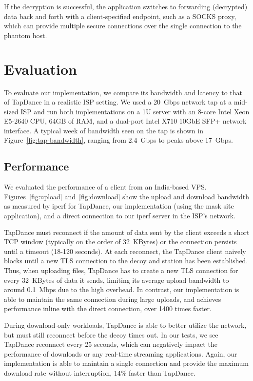 \documentclass[sigconf]{acmart}
\newcommand{\TODO}[1]{}
\renewcommand{\TODO}[1]{{\color{red} TODO: {#1}}}
\begin{document}
\FigTapBandwidth

If the decryption is successful, the application switches to forwarding
(decrypted) data back and forth with a client-specified endpoint, such as a
SOCKS proxy, which can provide multiple secure connections over the single
connection to the phantom host.


\section{Evaluation}
\label{sec:evaluation}


\FigUpload
\FigDownload

To evaluate our \scheme implementation, we compare its bandwidth and latency
to that of TapDance in a realistic ISP setting. We used a 20~Gbps
network tap at a mid-sized ISP and run both implementations on a 1U server with
an 8-core Intel Xeon E5-2640 CPU, 64GB of RAM, and a dual-port Intel X710 10GbE SFP+
network interface. A typical week of bandwidth seen on the tap is
shown in Figure~\ref{fig:tap-bandwidth}, ranging from 2.4~Gbps to peaks above
17~Gbps.

\subsection{Performance}

We evaluated the performance of a client from an India-based VPS.
Figures~\ref{fig:upload} and~\ref{fig:download} show the upload and download bandwidth as
measured by iperf for TapDance, our \scheme implementation (using the mask site application),
and a direct connection to our iperf server in the ISP's network.

TapDance must reconnect if the amount of data sent by the client
exceeds a short TCP window (typically on the order of 32~KBytes) or the
connection persists until a timeout (18-120 seconds). At each reconnect, the
TapDance client naively blocks until a new TLS connection to the decoy and
station has been established. Thus, when uploading files, TapDance has to create
a new TLS connection for every 32~KBytes of data it sends, limiting its average
upload bandwidth to around 0.1~Mbps due to the high overhead. In contrast,
our \scheme implementation is
able to maintain the same connection during large uploads, and achieves
performance inline with the direct connection, over 1400 times faster.

During download-only workloads, TapDance is able to better utilize the network,
but must still reconnect before the decoy times out. In our tests, we see
TapDance reconnect every 25 seconds, which can negatively impact the performance of
downloads or any real-time streaming applications. Again, our \scheme
implementation is able to maintain a single connection and provide the maximum
download rate without interruption, 14\% faster than TapDance.
\end{document}
